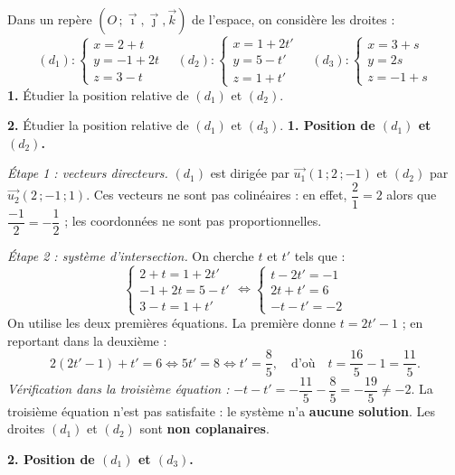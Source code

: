 \documentclass[11pt]{article}
\begin{document}
\begin{exoresolu}
Dans un repère $(O\,;\vec{\imath},\vec{\jmath},\vec{k})$ de l'espace, on considère les droites :
\[ (d_1) : \begin{cases} x = 2 + t \\ y = -1 + 2t \\ z = 3 - t \end{cases} \quad (d_2) : \begin{cases} x = 1 + 2t' \\ y = 5 - t' \\ z = 1 + t' \end{cases} \quad (d_3) : \begin{cases} x = 3 + s \\ y = 2s \\ z = -1 + s \end{cases} \]
\textbf{1.} Étudier la position relative de $(d_1)$ et $(d_2)$.

\textbf{2.} Étudier la position relative de $(d_1)$ et $(d_3)$.
\tcblower
\textbf{1. Position de $(d_1)$ et $(d_2)$.}

\emph{Étape 1 : vecteurs directeurs.} $(d_1)$ est dirigée par $\vec{u_1}(1\,;2\,;-1)$ et $(d_2)$ par $\vec{u_2}(2\,;-1\,;1)$. Ces vecteurs ne sont pas colinéaires : en effet, $\dfrac{2}{1} = 2$ alors que $\dfrac{-1}{2} = -\dfrac{1}{2}$ ; les coordonnées ne sont pas proportionnelles.

\emph{Étape 2 : système d'intersection.} On cherche $t$ et $t'$ tels que :
\[ \begin{cases} 2 + t = 1 + 2t' \\ -1 + 2t = 5 - t' \\ 3 - t = 1 + t' \end{cases} \iff \begin{cases} t - 2t' = -1 \\ 2t + t' = 6 \\ -t - t' = -2 \end{cases} \]
On utilise les deux premières équations. La première donne $t = 2t' - 1$ ; en reportant dans la deuxième :
\[ 2(2t' - 1) + t' = 6 \iff 5t' = 8 \iff t' = \dfrac{8}{5}, \quad \text{d'où} \quad t = \dfrac{16}{5} - 1 = \dfrac{11}{5}. \]
\emph{Vérification dans la troisième équation :} $-t - t' = -\dfrac{11}{5} - \dfrac{8}{5} = -\dfrac{19}{5} \neq -2$. La troisième équation n'est pas satisfaite : le système n'a \textbf{aucune solution}. Les droites $(d_1)$ et $(d_2)$ sont \textbf{non coplanaires}.

\textbf{2. Position de $(d_1)$ et $(d_3)$.}


\end{exoresolu}
\end{document}
